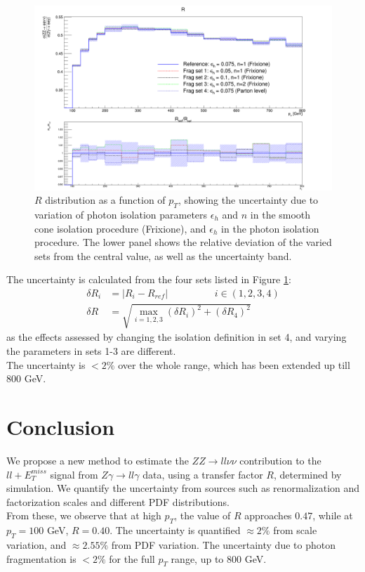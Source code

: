 \documentclass[11pt,a4paper,final]{report}
\newcommand{\ZZ}{$ZZ\to ll\nu\nu$ }
\newcommand{\Zgam}{$Z\gamma\to ll\gamma$ }
\begin{document}
\begin{figure}[H]
\centering
	\includegraphics[width=\textwidth]{frag.png}
	\caption{$R$ distribution as a function of $p_T$, showing the uncertainty due to variation of photon isolation parameters $\epsilon_h$ and $n$ in the smooth cone isolation procedure (Frixione), and $\epsilon_h$ in the photon isolation procedure. The lower panel shows the relative deviation of the varied sets from the central value, as well as the uncertainty band.}
	\label{fig:photon_frag}
\end{figure}

The uncertainty is calculated from the four sets listed in Figure \ref{fig:photon_frag}:
\begin{equation}
\begin{split}
\delta R_i &= |R_i - R_{ref}| \hspace{2cm}  i \in (1,2,3,4)\\
\delta R &= \sqrt{\max_{i=1,2,3}(\delta R_i)^2 + (\delta R_4)^2}
\end{split}
\end{equation}
as the effects assessed by changing the isolation definition in set 4, and varying the parameters in sets 1-3 are different.\\
The uncertainty is $< 2\%$ over the whole range, which has been extended up till 800 GeV.

\section{Conclusion}
We propose a new method to estimate the \ZZ contribution to the $ll + E_T^{miss}$ signal from \Zgam data, using a transfer factor $R$, determined by simulation. We quantify the uncertainty from sources such as renormalization and factorization scales and different PDF distributions.\\From these, we observe that at high $p_T$, the value of $R$ approaches $0.47$, while at $p_T = 100$ GeV, $R = 0.40$. The uncertainty is quantified $\approx 2\%$ from scale variation, and $\approx 2.55\%$ from PDF variation. The uncertainty due to photon fragmentation is $<2\%$ for the full $p_T$ range, up to 800 GeV.
\end{document}
